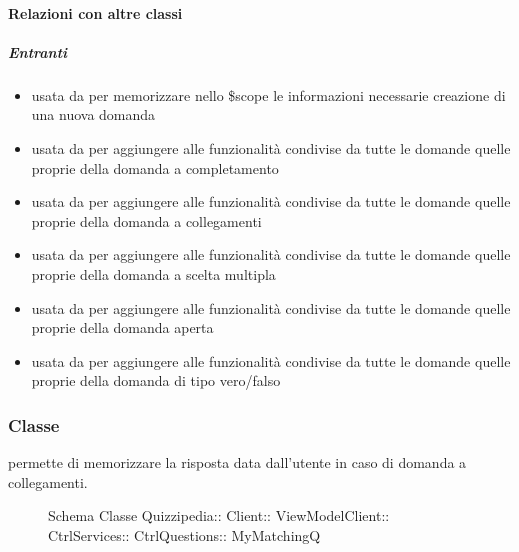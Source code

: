 \paragraph{Relazioni con altre classi}
\subparagraph{Entranti}
\begin{itemize}
\item usata da  per memorizzare nello \$scope le informazioni necessarie creazione di una nuova domanda
\item usata da  per aggiungere alle funzionalità condivise da tutte le domande quelle proprie della domanda a completamento
\item usata da  per aggiungere alle funzionalità condivise da tutte le domande quelle proprie della domanda a collegamenti
\item usata da  per aggiungere alle funzionalità condivise da tutte le domande quelle proprie della domanda a scelta multipla
\item usata da  per aggiungere alle funzionalità condivise da tutte le domande quelle proprie della domanda aperta
\item usata da  per aggiungere alle funzionalità condivise da tutte le domande quelle proprie della domanda di tipo vero/falso
\end{itemize}
\subsubsection{Classe }
permette di memorizzare la risposta data dall'utente in caso di domanda a collegamenti.
\begin{figure}[H]
\centering
\noindent{}
\caption[Schema Classe MyMatchingQ]{Schema Classe Quizzipedia:: Client:: ViewModelClient:: CtrlServices:: CtrlQuestions:: MyMatchingQ}
\end{figure}
